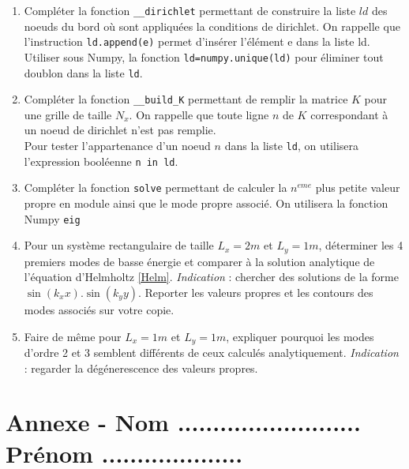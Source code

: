 \documentclass[a4paper, 12pt]{article}
\newcommand{\matlabscript}[2]
  {\begin{itemize}\item[]\end{itemize}}
\begin{document}
\begin{enumerate} 

\item Compléter la fonction  {\tt \_\_dirichlet} permettant de construire la liste $ld$ 
des noeuds du bord où sont appliquées la conditions de dirichlet.
On rappelle que
l'instruction {\tt ld.append(e)} permet d'insérer l'élément e dans la liste ld. 
Utiliser sous Numpy, la fonction {\tt ld=numpy.unique(ld)} pour éliminer tout doublon dans la liste {\tt ld}.


\item Compléter la fonction  {\tt \_\_build\_K} permettant de remplir la matrice $K$ pour une grille
de taille $N_x$.  On rappelle que toute ligne $n$ de $K$ correspondant à un noeud
de dirichlet n'est pas remplie. \\
Pour tester l'appartenance d'un noeud $n$ dans la liste {\tt ld}, on utilisera l'expression booléenne
 {\tt n in ld}. 

\item Compléter  la fonction  {\tt solve} permettant de calculer la $n^{eme}$ plus petite valeur propre
en module ainsi que le mode propre associé. On utilisera la fonction Numpy {\tt eig} 

\item Pour un système rectangulaire de taille $L_x=2m$ et $L_y=1m$, déterminer les 4 premiers modes de basse énergie et comparer à la solution analytique de l'équation d'Helmholtz \eqref{Helm}. 
{\it Indication} : chercher des solutions de la forme $\sin(k_x x).\sin(k_y y)$.
Reporter les valeurs propres et les contours des modes associés sur votre copie.

\item Faire de même pour $L_x=1m$ et $L_y=1m$, expliquer pourquoi les modes d'ordre 2 et 3
semblent différents de ceux calculés analytiquement.
{\it Indication} : regarder la dégénerescence des valeurs propres.

\end{enumerate} 



\section{Annexe - Nom .......................... Prénom ....................}
\end{document}
